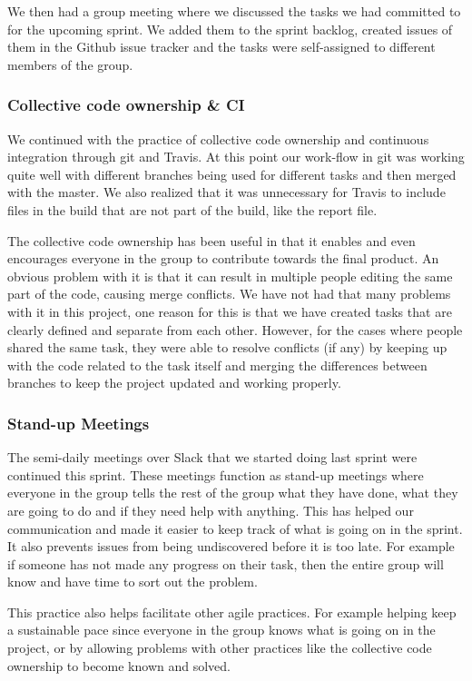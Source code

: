 \documentclass[14]{article}
\begin{document}
We then had a group meeting where we discussed the tasks we had committed to for the upcoming sprint. We added them to the sprint backlog, created issues of them in the Github issue tracker and the tasks were self-assigned to different members of the group. 

\subsubsection{Collective code ownership \& CI}

We continued with the practice of collective code ownership and continuous integration through git and Travis. At this point our work-flow in git was working quite well with different branches being used for different tasks and then merged with the master. We also realized that it was unnecessary for Travis to include files in the build that are not part of the build, like the report file. 

The collective code ownership has been useful in that it enables and even encourages everyone in the group to contribute towards the final product. An obvious problem with it is that it can result in multiple people editing the same part of the code, causing merge conflicts. We have not had that many problems with it in this project, one reason for this is that we have created tasks that are clearly defined and separate from each other. However, for the cases where people shared the same task, they were able to resolve conflicts (if any) by keeping up with the code related to the task itself and merging the differences between branches to keep the project updated and working properly.

\subsubsection{Stand-up Meetings}

The semi-daily meetings over Slack that we started doing last sprint were continued this sprint. These meetings function as stand-up meetings where everyone in the group tells the rest of the group what they have done, what they are going to do and if they need help with anything. This has helped our communication and made it easier to keep track of what is going on in the sprint. It also prevents issues from being undiscovered before it is too late. For example if someone has not made any progress on their task, then the entire group will know and have time to sort out the problem. 

This practice also helps facilitate other agile practices. For example helping keep a sustainable pace since everyone in the group knows what is going on in the project, or by allowing problems with other practices like the collective code ownership to become known and solved. 
\end{document}
